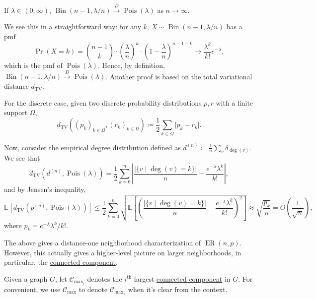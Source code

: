 \begin{claim}
	If \(\lambda \in (0, \infty )\), \(\operatorname{Bin}(n-1, \lambda / n) \overset{D}{\to} \operatorname{Pois}(\lambda ) \) as \(n \to \infty \).
\end{claim}
\begin{explanation}
	We see this in a straightforward way: for any \(k\), \(X \sim \operatorname{Bin}(n-1, \lambda / n) \) has a pmf
	\[
		\Pr_{}(X = k)
		= \binom{n-1}{k} \cdot \left( \frac{\lambda}{n} \right) ^{k} \cdot \left( 1 - \frac{\lambda}{n} \right) ^{n-1-k}
		\to \frac{\lambda ^k}{k!} e^{-\lambda },
	\]
	which is the pmf of \(\operatorname{Pois}(\lambda ) \). Hence, by definition, \(\operatorname{Bin}(n - 1, \lambda / n) \overset{D}{\to} \operatorname{Pois}(\lambda ) \). Another proof is based on the total variational distance \(d_{\mathrm{TV} }\).

	\begin{prev}
		For the discrete case, given two discrete probability distributions \(p, r\) with a finite support \(\Omega \),
		\[
			d_{\mathrm{TV} }((p_k)_{k \in \Omega }, (r_k)_{k \in \Omega })
			\coloneqq \frac{1}{2} \sum_{k \in \Omega } \lvert p_k - r_k \rvert.
		\]
	\end{prev}

	Now, consider the empirical degree distribution defined as \(d^{(n)} \coloneqq \frac{1}{n} \sum_{v} \delta _{\deg(v)}\). We see that
	\[
		d_{\mathrm{TV} } \left( d^{(n)} , \operatorname{Pois}(\lambda ) \right)
		= \frac{1}{2} \sum_{k=0}^{n} \left\lvert \frac{\lvert \{ v \mid \deg(v) = k \}  \rvert }{n} - \frac{e^{-\lambda } \lambda ^k}{k!} \right\rvert ,
	\]
	and by Jensen's inequality,
	\[
		\mathbb{E}_{}\left[d_{\mathrm{TV} } \left( p^{(n)} , \operatorname{Pois}(\lambda ) \right) \right]
		\leq \frac{1}{2} \sum_{k=0}^{n} \sqrt{ \mathbb{E}_{}\left[ \left( \frac{\lvert \{ v \mid \deg(v) = k \}  \rvert }{n} - \frac{e^{-\lambda } \lambda ^k}{k!} \right) ^2 \right] }
		\approx \sqrt{\frac{p_k}{n}}
		= O\left( \frac{1}{\sqrt{n} } \right) ,
	\]
	where \(p_k = e^{-\lambda } \lambda ^k / k!\).
\end{explanation}

The above gives a distance-one neighborhood characterization of \(\operatorname{ER}(n, p)\). However, this actually gives a higher-level picture on larger neighborhoods, in particular, the \hyperref[def:connected-component]{connected component}.

\begin{notation}
	Given a graph \(G\), let \(\mathcal{C} _{\max _i}\) denotes the \(i^{\text{th} }\) largest \hyperref[def:connected-component]{connected component} in \(G\). For convenient, we use \(\mathcal{C} _{\max }\) to denote \(\mathcal{C} _{\max _1}\) when it's clear from the context.
\end{notation}

